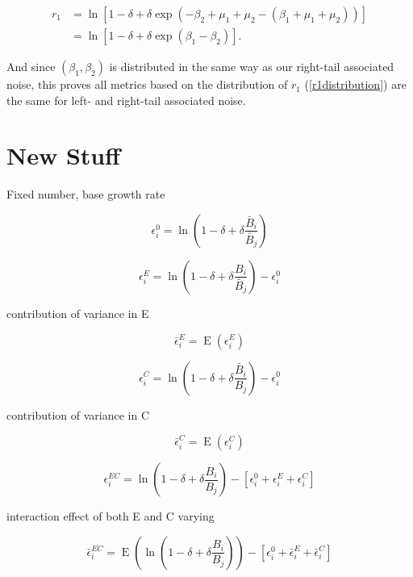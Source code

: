 \documentclass[letterpaper,11pt]{article}
\DeclareMathOperator{\EX}{E}%
\begin{document}
\begin{align}
r_1 &= \ln[1-\delta+\delta \exp(-\beta_2+\mu_1+\mu_2-(\beta_1+\mu_1+\mu_2))]\\
&= \ln[1-\delta+\delta \exp(\beta_1-\beta_2)].
\end{align}

\noindent And since $(\beta_1, \beta_2)$ is distributed in the same way as our right-tail associated noise, this proves all metrics based on the distribution of $r_1$ (\ref{r1distribution}) are the same for left- and right-tail associated noise.



\section{New Stuff}

Fixed number, base growth rate

\begin{equation}
\epsilon_i^0=\ln(1-\delta + \delta \frac{\bar B_i}{\bar B_j}) \label{null_i}
\end{equation}

\begin{equation}
\epsilon_i^E=\ln(1-\delta + \delta \frac{B_i}{\bar B_j}) -  \epsilon_i^0 \label{Evar}
\end{equation}

contribution of variance in E

\begin{equation}
\bar \epsilon_i^E=\EX(\epsilon_i^E) \label{Evar_mean}
\end{equation}

\begin{equation}
\epsilon_i^C=\ln(1-\delta + \delta \frac{\bar B_i}{B_j}) -  \epsilon_i^0 \label{Cvar}
\end{equation}

contribution of variance in C

\begin{equation}
\bar \epsilon_i^C=\EX(\epsilon_i^C) \label{Cvar_mean}
\end{equation}

\begin{equation}
\epsilon_i^{EC}=\ln(1-\delta + \delta \frac{B_i}{B_j}) -  [\epsilon_i^0 + \epsilon_i^E + \epsilon_i^C] \label{ECvar}
\end{equation}

interaction effect of both E and C varying

\begin{equation}
\bar \epsilon_i^{EC}=\EX(\ln(1-\delta + \delta \frac{B_i}{B_j})) -[\epsilon_i^0 +\bar \epsilon_i^E + \bar \epsilon_i^C] \label{ECvar_mean}
\end{equation}
\end{document}
